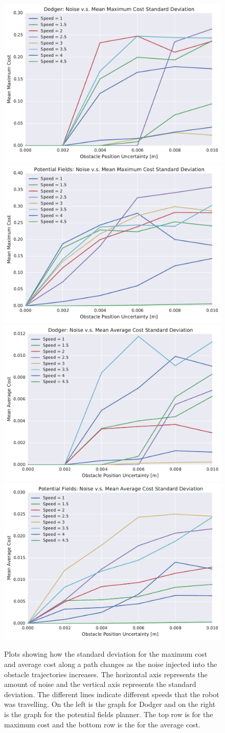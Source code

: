 \begin{figure}[h!]
    \centering

    \includegraphics[width=0.48\linewidth]{figs/planner_std_max_cost_2}
    \includegraphics[width=0.48\linewidth]{figs/pf_std_max_cost_2} \\
    \includegraphics[width=0.48\linewidth]{figs/planner_std_avg_cost_2}
    \includegraphics[width=0.48\linewidth]{figs/pf_std_avg_cost_2}

    \caption{Plots showing how the standard deviation for the maximum cost and
        average cost along a path changes as the noise injected into the
        obstacle trajectories increases. The horizontal axis represents the
        amount of noise and the vertical axis represents the standard
        deviation. The different lines indicate different speeds that the robot
        was travelling. On the left is the graph for Dodger and on the right is
    the graph for the potential fields planner. The top row is for the maximum
cost and the bottom row is the for the average cost.}

\end{figure}

